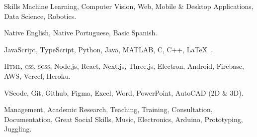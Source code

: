 
\begin{rubric}{Skills}
  Machine Learning, Computer Vision, Web, Mobile \& Desktop Applications, Data Science, Robotics.

  Native English, Native Portuguese, Basic Spanish.

  JavaScript, TypeScript, Python, Java, MATLAB, C, C++, \LaTeX\ .

  \textsc{Html, css, scss}, Node.js, React, Next.js, Three.js, Electron, Android, Firebase, AWS, Vercel, Heroku.

  VScode, Git, Github, Figma, Excel, Word, PowerPoint, AutoCAD (2D \& 3D).

  \entry*[Misc.]
  Management, Academic Research, Teaching, Training, Consultation, Documentation, Great Social Skills, Music, Electronics, Arduino, Prototyping, Juggling.
\end{rubric}
